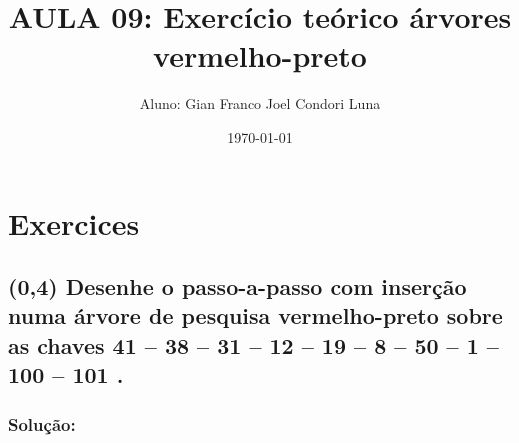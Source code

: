 \documentclass{article}
\title{AULA 09: Exercício teórico árvores vermelho-preto}
\author{Aluno: Gian Franco Joel Condori Luna}
\date{\today}
\begin{document}
\maketitle

\section*{Exercices}
\setcounter{section}{1}
\subsection {(0,4) Desenhe o passo-a-passo com inserção numa árvore de pesquisa 
vermelho-preto sobre as chaves {41 – 38 – 31 – 12 – 19 – 8 – 50 – 1 – 100 – 101 }.}

\subsubsection{Solução:}
\end{document}
